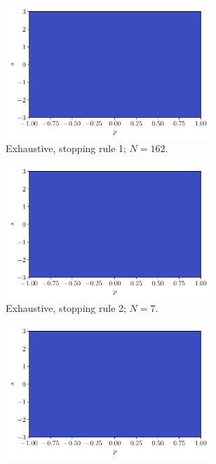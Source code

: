 \documentclass[a4paper, 12pt]{article}
\begin{document}
    \begin{figure}[H]
        \centering
        \begin{subfigure}{0.49\textwidth}
            \centering
            \includegraphics[width=0.85\textwidth]{resources/pdf/4_exhaustive_1_LR_mu.pdf}
            \caption{Exhaustive, stopping rule 1; $N = 162$.}
            \vspace{0.5em}
        \end{subfigure}
        \hfill
        \begin{subfigure}{0.49\textwidth}
            \centering
            \includegraphics[width=0.85\textwidth]{resources/pdf/4_exhaustive_2_LR_mu.pdf}
            \caption{Exhaustive, stopping rule 2; $N = 7$.}
            \vspace{0.5em}
        \end{subfigure}
        \begin{subfigure}{0.49\textwidth}
            \centering
            \includegraphics[width=0.85\textwidth]{resources/pdf/4_montecarlo_1_LR_mu.pdf}

\end{subfigure}
\end{figure}
\end{document}
